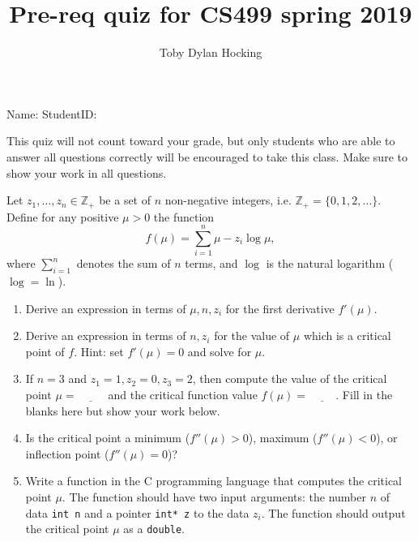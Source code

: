 \documentclass{article}
\begin{document}
\title{Pre-req quiz for CS499 spring 2019}
\author{Toby Dylan Hocking}
\thispagestyle{empty}

Name: \underline{\hspace{3in}} StudentID: \underline{\hspace{2in}}

This quiz will not count toward your grade, but only students who are
able to answer all questions correctly will be encouraged to take this
class. Make sure to show your work in all questions.

Let $z_1, \dots, z_n\in\mathbb Z_+$ be a set of $n$ non-negative integers,
i.e. $\mathbb Z_+=\{0, 1, 2, \dots\}$. Define for any positive $\mu>0$ the function
$$ f(\mu) = \sum_{i=1}^n \mu - z_i\log \mu, $$
where $\sum_{i=1}^n$ denotes the sum of $n$ terms, and $\log$ is the
natural logarithm ($\log=\ln$).

\begin{enumerate}
\item Derive an expression in terms of $\mu,n,z_i$ for the first derivative
  $f'(\mu)$. 

\vskip 1in
\item Derive an expression in terms of $n,z_i$ for the value of $\mu$
  which is a critical point of $f$. Hint: set $f'(\mu)=0$ and solve
  for $\mu$.

\vskip 1in
\item If $n=3$ and $z_1=1, z_2=0, z_3=2$, then compute the value of
  the critical point $\mu=\underline{\hspace{1cm}}$ and the critical
  function value $f(\mu)=\underline{\hspace{1cm}}$. Fill in the blanks
  here but show your work below.

\vskip 1in
\item Is the critical point a minimum ($f''(\mu)>0$), maximum
  ($f''(\mu)<0$), or inflection point ($f''(\mu)=0$)?

\vskip 1in
\item Write a function in the C programming language that computes the
  critical point $\mu$. The function should have two input arguments:
  the number $n$ of data \texttt{int n} and a pointer \texttt{int* z}
  to the data $z_i$. The function should output the critical point
  $\mu$ as a \texttt{double}.
\end{enumerate}
\end{document}
